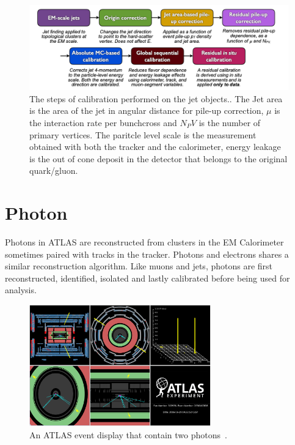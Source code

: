 \begin{figure}[!htb]
    \begin{center}
        \includegraphics[width=1.1\textwidth]{figures/common_ana/JetCalibration}
        \caption{        
            The steps of calibration performed on the jet objects.\cite{Mehlhase:2770815}. The Jet area is the area of the jet in angular distance for pile-up correction, $\mu$ is the interaction rate per bunchcross and $N_PV$ is the number of primary vertices. The paritcle level scale is the measurement obtained with both the tracker and the calorimeter, energy leakage is the out of cone deposit in the detector that belongs to the original quark/gluon.
        }
        \label{fig:JetCalibration}
    \end{center}
\end{figure}

\section{Photon}
\label{sec:Photon}
Photons in ATLAS are reconstructed from clusters in the EM Calorimeter sometimes paired with tracks in the tracker. Photons and electrons shares a similar reconstruction algorithm. Like muons and jets, photons are first reconstructed, identified, isolated and lastly calibrated before being used for analysis. 

\begin{figure}[!htb]
    \begin{center}
        \includegraphics[width=0.7\textwidth]{figures/common_ana/photonEvent}
        \caption{        
        An ATLAS event display that contain two photons~\cite{atlastwophoton}.
        }
        \label{fig:photonEvent}
    \end{center}
\end{figure}

